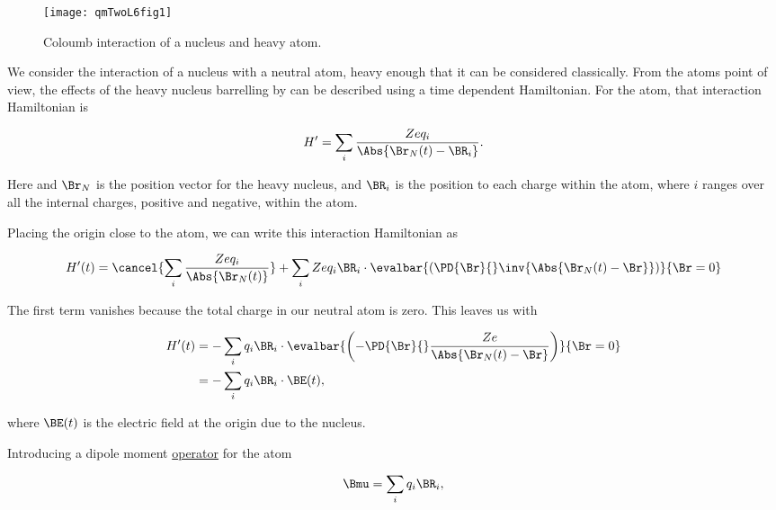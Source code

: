 \begin{figure}[htp]
\centering
\texttt{[image: qmTwoL6fig1]}
\caption{Coloumb interaction of a nucleus and heavy atom.}\label{fig:qmTwoL6fig1}
\end{figure}

We consider the interaction of a nucleus with a neutral atom, heavy enough that it can be considered classically.  From the atoms point of view, the effects of the heavy nucleus barrelling by can be described using a time dependent Hamiltonian.  For the atom, that interaction Hamiltonian is

\begin{equation}\label{eqn:qmTwoL6:10}
H' = \sum_i \frac{ Z e q_i }{\Abs{\Br_N(t) - \BR_i}}.
\end{equation}

Here and $\Br_N$ is the position vector for the heavy nucleus, and $\BR_i$ is the position to each charge within the atom, where $i$ ranges over all the internal charges, positive and negative, within the atom.

Placing the origin close to the atom, we can write this interaction Hamiltonian as

\begin{equation}\label{eqn:qmTwoL6:30}
H'(t) = \cancel{\sum_i \frac{Z e q_i}{\Abs{\Br_N(t)}}}
+ \sum_i Z e q_i \BR_i \cdot 
\evalbar{\left(
\PD{\Br}{} \inv{\Abs{ \Br_N(t) - \Br}}
\right)}{\Br = 0}
\end{equation}

The first term vanishes because the total charge in our neutral atom is zero.  This leaves us with

\begin{equation}\label{eqn:qmTwoL6:50}
\begin{aligned}
H'(t) 
&= 
-\sum_i q_i \BR_i \cdot \evalbar{\left(
-\PD{\Br}{} \frac{ Z e}{\Abs{ \Br_N(t) - \Br}}
\right)}{\Br = 0} \\
&= - \sum_i q_i \BR_i \cdot \BE(t),
\end{aligned}
\end{equation}

where $\BE(t)$ is the electric field at the origin due to the nucleus.

Introducing a dipole moment \underline{operator} for the atom

\begin{equation}\label{eqn:qmTwoL6:70}
\Bmu = \sum_i q_i \BR_i,
\end{equation}

